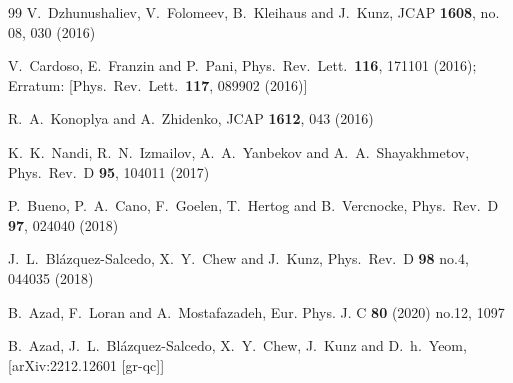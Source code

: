 \documentclass[twocolumn,showpacs,preprintnumbers,amsmath,amssymb,floatfix]{revtex4-1}
\begin{document}
\begin{thebibliography}{99}
  V.~Dzhunushaliev, V.~Folomeev, B.~Kleihaus and J.~Kunz,
  JCAP {\bf 1608}, no. 08, 030 (2016)

  V.~Cardoso, E.~Franzin and P.~Pani,
  Phys.\ Rev.\ Lett.\  {\bf 116}, 171101 (2016);
  Erratum: [Phys.\ Rev.\ Lett.\  {\bf 117}, 089902 (2016)]

  R.~A.~Konoplya and A.~Zhidenko,
  JCAP {\bf 1612}, 043 (2016)

  K.~K.~Nandi, R.~N.~Izmailov, A.~A.~Yanbekov and A.~A.~Shayakhmetov,
  Phys.\ Rev.\ D {\bf 95}, 104011 (2017)

  P.~Bueno, P.~A.~Cano, F.~Goelen, T.~Hertog and B.~Vercnocke,
  Phys.\ Rev.\ D {\bf 97}, 024040 (2018)

  J.~L.~Bl\'{a}zquez-Salcedo, X.~Y.~Chew and J.~Kunz,
  Phys.\ Rev.\ D {\bf 98} no.4,  044035 (2018)

B.~Azad, F.~Loran and A.~Mostafazadeh,
Eur. Phys. J. C \textbf{80} (2020) no.12, 1097

B.~Azad, J.~L.~Bl\'azquez-Salcedo, X.~Y.~Chew, J.~Kunz and D.~h.~Yeom,
[arXiv:2212.12601 [gr-qc]]


\end{thebibliography}
\end{document}
